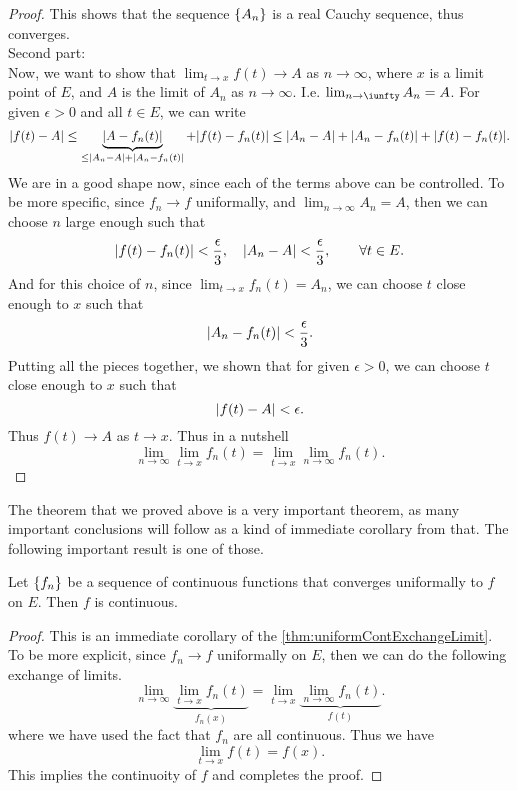 \begin{proof}
	This shows that the sequence $ \{A_n\} $ is a real Cauchy sequence, thus converges. \\
	{\color{orange} Second part: }\\
	\noindent Now, we want to show that $ \lim_{t\to x}f(t) \to A $ as $ n\to \infty $, where $ x $ is a limit point of $ E $, and $ A $ is the limit of $ A_n $ as $ n\to \infty $. I.e. $ \lim_{n\to\iunfty}A_n= A $. For given $\epsilon>0$ and all $ t \in E $, we can write
	\[ |f(t) - A| \leq \underbrace{|A - f_n(t)|}_{\leq |A_n - A|+|A_n-f_n(t)|} + |f(t) - f_n(t)| \leq |A_n - A|+|A_n-f_n(t)| + |f(t) - f_n(t)|. \]
	We are in a good shape now, since each of the terms above can be controlled. To be more specific, since $ f_n \to f $ uniformally, and $ \lim_{n\to\infty} A_n = A $, then we can choose $ n $ large enough such that 
	\[ |f(t) - f_n(t)| < \frac\epsilon3, \quad |A_n - A| < \frac\epsilon3  , \qquad \forall t\in E. \]
	And for this choice of $ n $, since $ \lim_{t \to x}f_n(t)=A_n$, we can choose $ t $ close enough to $ x $ such that 
	\[ |A_n - f_n(t)| < \frac\epsilon3. \]
	Putting all the pieces together, we shown that for given $ \epsilon>0 $, we can choose $ t $ close enough to $ x $ such that 
	\[ |f(t) -  A| < \epsilon.  \]
	Thus $ f(t) \to A $ as $ t \to x $. Thus in a nutshell
	\[ \lim_{n\to\infty}\lim_{t\to x}f_n(t) = \lim_{t\to x}\lim_{n\to\infty}f_n(t). \]
\end{proof}

The theorem that we proved above is a very important theorem, as many important conclusions will follow as a kind of immediate corollary from that. The following important result is one of those.

\begin{corollary}
	\label{cor:UniformConvImpCont}
	Let $ \{f_n\} $ be a sequence of continuous functions that converges uniformally to $ f $ on $ E $. Then $ f $ is continuous.
\end{corollary}
\begin{proof}
	This is an immediate corollary of the \autoref{thm:uniformContExchangeLimit}. To be more explicit, since $ f_n \to f $ uniformally on $ E $, then we can do the following exchange of limits.
	\[ \lim_{n\to\infty}\underbrace{\lim_{t\to x}f_n(t)}_{f_n(x)} = \lim_{t\to x}\underbrace{\lim_{n\to\infty}f_n(t)}_{f(t)}. \]
	where we have used the fact that $ f_n $ are all continuous. Thus we have 
	\[ \lim_{t\to x} f(t) = f(x). \]
	This implies the continuoity of $ f $ and completes the proof.
\end{proof}

